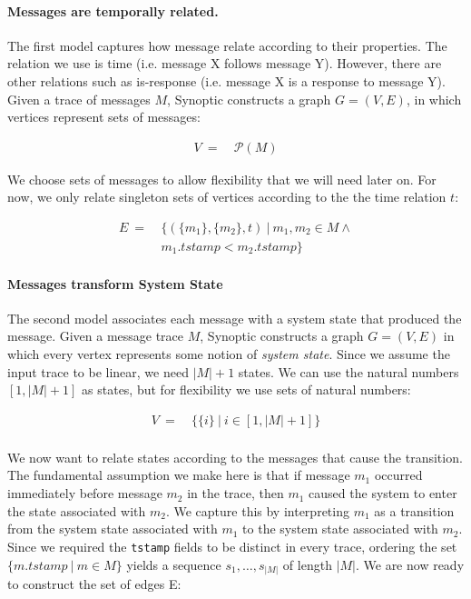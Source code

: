 \paragraph{Messages are temporally related.} The first model captures
how message relate according to their properties. The relation we use
is time (i.e. message X follows message Y). However, there are other
relations such as is-response (i.e. message X is a response to message
Y). Given a trace of messages $M$, Synoptic constructs a graph $G =
(V, E)$, in which vertices represent sets of messages:

\begin{align*}
  V~=~&\mathcal{P}(M)
\end{align*}

We choose sets of messages to allow flexibility that we will need
later on. For now, we only relate singleton sets of vertices according
to the the time relation $t$:

\begin{align*}
E~=~&\{(\{m_1\},\{m_2\},t)~|~m_1,m_2\in{M}\wedge{}\\
	&m_1.tstamp < m_2.tstamp\}
\end{align*}


\paragraph{Messages transform System State} The second model
associates each message with a system state that produced the
message. Given a message trace $M$, Synoptic constructs a graph $G =
(V, E)$ in which every vertex represents some notion of \textit{system
  state}. Since we assume the input trace to be linear, we need
$|M|+1$ states. We can use the natural numbers $[1,|M|+1]$ as states,
but for flexibility we use sets of natural numbers:

\begin{align*}
V~=~&\{\{i\}~|~i\in[1,|M|+1]\}\\
\end{align*}

We now want to relate states according to the messages that cause the
transition. The fundamental assumption we make here is that if message
$m_1$ occurred immediately before message $m_2$ in the trace, then
$m_1$ caused the system to enter the state associated with $m_2$. We
capture this by interpreting $m_1$ as a transition from the system
state associated with $m_1$ to the system state associated with
$m_2$. Since we required the \texttt{tstamp} fields to be distinct in
every trace, ordering the set $\{m.tstamp~|~m\in{M}\}$ yields a
sequence $s_1,\dots,s_{|M|}$ of length $|M|$. We are now ready to
construct the set of edges E:

